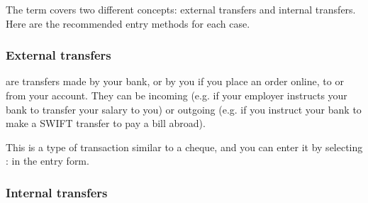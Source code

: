 The term  covers two different concepts: external transfers and internal transfers. Here are the recommended entry methods for each case.


\subsubsection{External transfers\label{transactions-new-transfer-external}}

 are transfers made by your bank, or by you if you place an order online, to or from your account. They can be incoming (e.g. if your employer instructs your bank to transfer your salary to you) or outgoing (e.g. if you instruct your bank to make a SWIFT transfer to pay a bill abroad).

This is a type of transaction similar to a cheque, and you can enter it by selecting :  in the entry form.


\subsubsection{Internal transfers\label{transactions-new-transfer-internal}}

